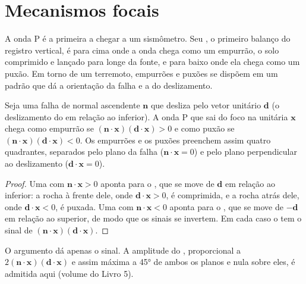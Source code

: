 \section{Mecanismos focais}\label{sec:b1:earthquake-source:focal}

A onda P é a primeira a chegar a um sismômetro. Seu , o primeiro balanço do registro vertical, é para cima onde a onda chega como um empurrão, o solo comprimido e lançado para longe da fonte, e para baixo onde ela chega como um puxão. Em torno de um terremoto, empurrões e puxões se dispõem em um padrão que dá a orientação da falha e a  do deslizamento.

\begin{proposition}\label{prop:b1:earthquake-source:first-motion}
Seja uma falha de normal ascendente $\mathbf n$ que desliza pelo vetor unitário $\mathbf d$
(o deslizamento do  em relação ao inferior). A onda P que sai do foco na  unitária $\mathbf x$ chega como empurrão se
$(\mathbf n\cdot\mathbf x)(\mathbf d\cdot\mathbf x) > 0$ e como puxão se
$(\mathbf n\cdot\mathbf x)(\mathbf d\cdot\mathbf x) < 0$. Os empurrões e os puxões preenchem assim quatro quadrantes, separados pelo plano da falha
($\mathbf n\cdot\mathbf x = 0$) e pelo plano perpendicular ao deslizamento ($\mathbf d\cdot\mathbf x = 0$).
\end{proposition}

\begin{proof}
Uma  com $\mathbf n\cdot\mathbf x > 0$ aponta para o , que se move de $\mathbf d$ em relação ao inferior: a rocha à frente dele, onde $\mathbf d\cdot\mathbf x > 0$, é comprimida, e a rocha atrás dele, onde $\mathbf d\cdot\mathbf x < 0$, é puxada. Uma  com
$\mathbf n\cdot\mathbf x < 0$ aponta para o , que se move de $-\mathbf d$ em relação ao superior, de modo que os sinais se invertem. Em cada
caso o  tem o sinal de $(\mathbf n\cdot\mathbf x)(\mathbf
d\cdot\mathbf x)$.
\end{proof}

O argumento dá apenas o sinal. A amplitude do , proporcional a $2(\mathbf n\cdot\mathbf x)(\mathbf d\cdot\mathbf x)$ e assim máxima a \ang{45} de ambos os planos e nula sobre eles, é admitida aqui (volume do Livro 5).

